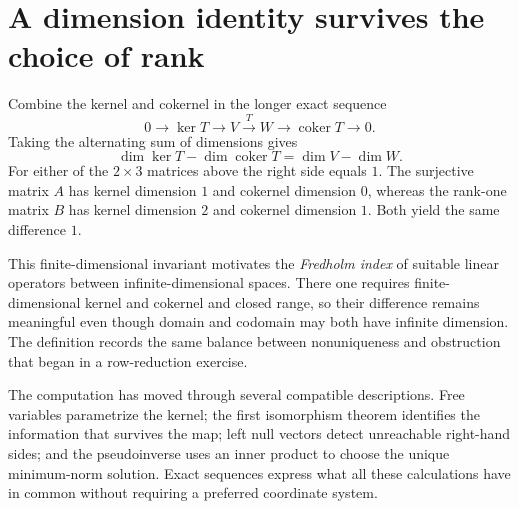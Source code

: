\section{A dimension identity survives the choice of rank}

Combine the kernel and cokernel in the longer exact sequence
\[
 0\longrightarrow\ker T\longrightarrow V
 \xrightarrow{T}W\longrightarrow
 \operatorname{coker}T\longrightarrow0.
\]
Taking the alternating sum of dimensions gives
\[
 \boxed{\dim\ker T-\dim\operatorname{coker}T
 =\dim V-\dim W.}
\]
For either of the \(2\times3\) matrices above the right side equals \(1\). The surjective matrix \(A\) has kernel dimension \(1\) and cokernel dimension \(0\), whereas the rank-one matrix \(B\) has kernel dimension \(2\) and cokernel dimension \(1\). Both yield the same difference \(1\).

This finite-dimensional invariant motivates the \emph{Fredholm index} of suitable linear operators between infinite-dimensional spaces. There one requires finite-dimensional kernel and cokernel and closed range, so their difference remains meaningful even though domain and codomain may both have infinite dimension. The definition records the same balance between nonuniqueness and obstruction that began in a row-reduction exercise.

The computation has moved through several compatible descriptions. Free variables parametrize the kernel; the first isomorphism theorem identifies the information that survives the map; left null vectors detect unreachable right-hand sides; and the pseudoinverse uses an inner product to choose the unique minimum-norm solution. Exact sequences express what all these calculations have in common without requiring a preferred coordinate system.
